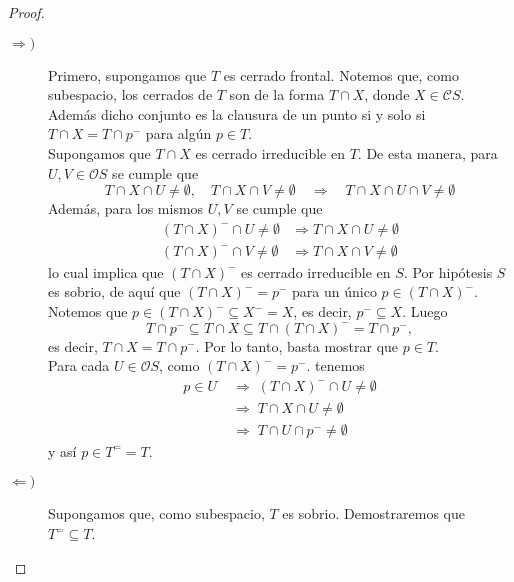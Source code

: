 \begin{proof}
\begin{description}
    \item[$\Rightarrow )$] Primero, supongamos que $T$ es cerrado frontal. Notemos que, como subespacio, los cerrados de $T$ son de la forma $T\cap X$, donde $X\in \mathcal{C}S$. Además dicho conjunto es la clausura de un punto si y solo si $T\cap X=T\cap p^-$ para algún $p\in T$.\\

    Supongamos que $T\cap X$ es cerrado irreducible en $T$. De esta manera, para $U, V\in \mathcal{O}S$ se cumple que 
    \[
    T\cap X\cap U\neq \emptyset,\quad T\cap X\cap V\neq \emptyset \quad \Rightarrow \quad T\cap X\cap U\cap V\neq \emptyset
    \]
    Además, para los mismos $U, V$ se cumple que 
    \[
    \begin{split}
    (T\cap X)^-\cap U\neq \emptyset & \Rightarrow T\cap X\cap U\neq \emptyset\\
    (T\cap X)^-\cap V\neq \emptyset & \Rightarrow T\cap X\cap V\neq \emptyset
        \end{split}
    \]
    lo cual implica que $(T\cap X)^-$ es cerrado irreducible en $S$. Por hipótesis $S$ es sobrio, de aquí que $(T\cap X)^-=p^-$ para un único $p\in (T\cap X)^-$. Notemos que $p\in (T\cap X)^-\subseteq X^-=X$, es decir, $p^-\subseteq X$. Luego 
    \[
    T\cap p^-\subseteq T\cap X\subseteq T\cap (T\cap X)^-= T\cap p^-,
    \]
    es decir, $T\cap X=T\cap p^-$. Por lo tanto, basta mostrar que $p\in T$.\\

    Para cada $U\in \mathcal{O}S$, como $(T\cap X)^-=p^-$. tenemos 
    \[
    \begin{split}
        p\in U\; &\Rightarrow \; (T\cap X)^-\cap U\neq \emptyset\\
        & \Rightarrow \; T\cap X\cap U\neq \emptyset\\
        &\Rightarrow \; T\cap U\cap p^-\neq \emptyset
    \end{split}
    \]
    y así $p\in T^==T$.
    \item[$\Leftarrow )$] Supongamos que, como subespacio, $T$ es sobrio. Demostraremos que $T^=\subseteq T$.\\


\end{description}
\end{proof}
